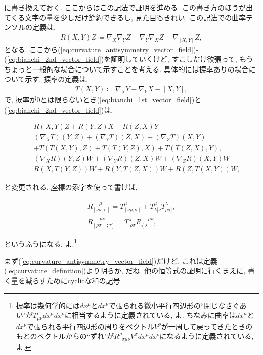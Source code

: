 \documentclass{ltjsarticle}
\theoremstyle{definition}
\newcommand{\parno}{\par\noindent}
\begin{document}
\parno
に書き換えておく. ここからはこの記法で証明を進める. この書き方のほうが出てくる文字の量を少しだけ節約できるし, 見た目もきれい. この記法での曲率テンソルの定義は,
\begin{gather}
R(X,Y)Z\coloneqq\nabla_X\nabla_YZ-\nabla_Y\nabla_XZ-\nabla_{[X,Y]}Z,\label{eq:curvature_definition}
\end{gather}
となる. ここから(\ref{eq:curvature_antisymmetry_vector_field})-(\ref{eq:bianchi_2nd_vector_field})を証明していくけど, すこしだけ欲張って, もうちょっと一般的な場合について示すことを考える. 具体的には捩率ありの場合について示す. 捩率の定義は,
\begin{gather}
T(X,Y)\coloneqq\nabla_XY-\nabla_YX-[X,Y],
\end{gather}
で, 捩率が0とは限らないとき(\ref{eq:bianchi_1st_vector_field})と(\ref{eq:bianchi_2nd_vector_field})は,
\begin{tcolorbox}
\begin{align}
&R(X,Y)Z+R(Y,Z)X+R(Z,X)Y\nonumber\\
=&(\nabla_XT)(Y,Z)+(\nabla_YT)(Z,X)+(\nabla_ZT)(X,Y)\nonumber\\
&+T(T(X,Y),Z)+T(T(Y,Z),X)+T(T(Z,X),Y),\label{eq:bianchi_1st_torsion}\\
&(\nabla_XR)(Y,Z)W+(\nabla_YR)(Z,X)W+(\nabla_ZR)(X,Y)W\nonumber\\
=&R(X,T(Y,Z))W+R(Y,T(Z,X))W+R(Z,T(X,Y))W,\label{eq:bianchi_2nd_torsion}
\end{align}
\end{tcolorbox}
\parno
と変更される. 座標の添字を使って書けば,
\begin{tcolorbox}
\begin{gather}
R^{\phantom{[\nu\rho}\mu}_{[\nu\rho\phantom\mu\sigma]}=T^\mu_{[\nu\rho;\sigma]}+T^\mu_{\lambda[\nu}T^\lambda_{\rho\sigma]},\\
R_{[\rho\sigma\phantom{\mu\nu};\tau]}^{\phantom{[\rho\sigma}\mu\nu}=T^\lambda_{[\rho\sigma}R_{\tau]\lambda}^{\phantom{\lambda[\rho}\mu\nu},
\end{gather}
\end{tcolorbox}
\parno
というふうになる, よ.\footnote{捩率は幾何学的には$dx^\mu$と$dx^\nu$で張られる微小平行四辺形の``閉じなさぐあい"が$T_{\mu\nu}^\rho dx^\mu dx^\nu$に相当するように定義されている, よ. ちなみに曲率は$dx^\mu$と$dx^\nu$で張られる平行四辺形の周りをベクトル$V^\rho$が一周して戻ってきたときのもとのベクトルからの``ずれ"が$R^\rho_{\phantom{\rho}\sigma\mu\nu}V^\sigma dx^\mu dx^\nu$になるように定義されている, よ.}
\par
まず(\ref{eq:curvature_antisymmetry_vector_field})だけど, これは定義(\ref{eq:curvature_definition})より明らか, だね. 他の恒等式の証明に行くまえに, 書く量を減らすためにcyclicな和の記号
\end{document}
